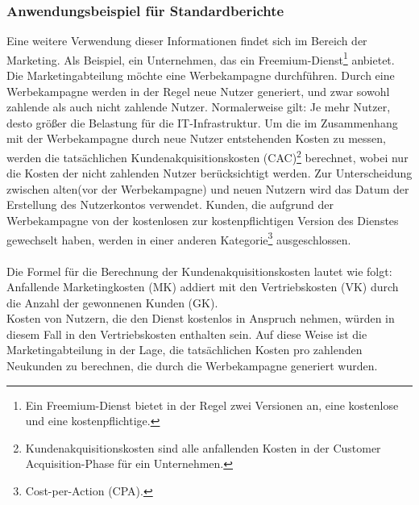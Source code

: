 \subsubsection*{Anwendungsbeispiel für Standardberichte}
Eine weitere Verwendung dieser Informationen findet sich im Bereich der Marketing. Als Beispiel, ein Unternehmen, das ein Freemium-Dienst\footnote{Ein Freemium-Dienst bietet in der Regel zwei Versionen an, eine kostenlose und eine kostenpflichtige\cite{MAR2}.} anbietet. Die Marketingabteilung möchte eine Werbekampagne durchführen. Durch eine Werbekampagne werden in der Regel neue Nutzer generiert, und zwar sowohl zahlende als auch nicht zahlende Nutzer. Normalerweise gilt: Je mehr Nutzer, desto größer die Belastung für die IT-Infrastruktur. Um die im Zusammenhang mit der Werbekampagne durch neue Nutzer entstehenden Kosten zu messen, werden die tatsächlichen Kundenakquisitionskosten (CAC)\footnote{Kundenakquisitionskosten sind alle anfallenden Kosten in der Customer Acquisition-Phase für ein Unternehmen\cite{MAR1}.} berechnet, wobei nur die Kosten der nicht zahlenden Nutzer berücksichtigt werden. Zur Unterscheidung zwischen alten(vor der Werbekampagne) und neuen Nutzern wird das Datum der Erstellung des Nutzerkontos verwendet. Kunden, die aufgrund der Werbekampagne von der kostenlosen zur kostenpflichtigen Version des Dienstes gewechselt haben, werden in einer anderen Kategorie\footnote{Cost-per-Action (CPA)\cite{MAR3}.} ausgeschlossen.
\\\\ 
Die Formel für die Berechnung der Kundenakquisitionskosten lautet wie folgt:\\
Anfallende Marketingkosten (MK) addiert mit den Vertriebskosten (VK) durch die Anzahl der gewonnenen Kunden (GK).\\
Kosten von Nutzern, die den Dienst kostenlos in Anspruch nehmen, würden in diesem Fall in den Vertriebskosten enthalten sein. Auf diese Weise ist die Marketingabteilung in der Lage, die tatsächlichen Kosten pro zahlenden Neukunden zu berechnen, die durch die Werbekampagne generiert wurden.  

